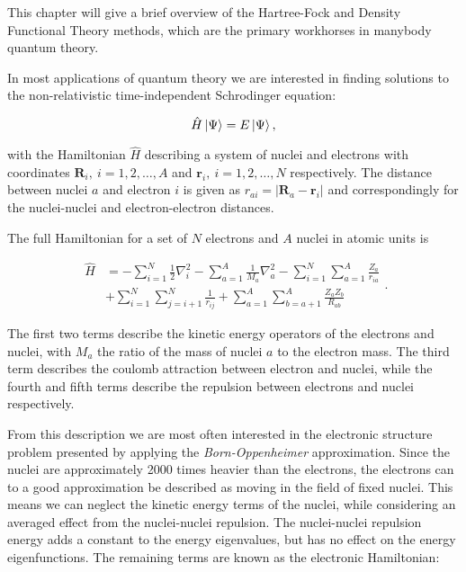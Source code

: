 This chapter will give a brief overview of the Hartree-Fock
and Density Functional Theory methods, which are the primary workhorses
in manybody quantum theory.
\par
In most applications of quantum theory we are interested in
finding solutions to the non-relativistic time-independent
Schrodinger equation:

$$ \hat{H} \ket{\Psi} = E \ket{\Psi} ,$$

with the Hamiltonian $\hat{H}$ describing a system of nuclei and electrons
with coordinates $\bm{R}_i, \ i=1,2,\dots,A$ and $\bm{r}_i, \
i=1,2,\dots,N$ respectively. The distance between nuclei $a$
and electron $i$ is given as $r_{ai} = \left| \bm{R}_a - \bm{r}_i \right|$
and correspondingly for the nuclei-nuclei and electron-electron distances.
\par
The full Hamiltonian for a set of $N$ electrons and $A$ nuclei
in atomic units is

\begin{equation}
    \begin{split}
        \hat{H}
        &= -\sum_{i=1}^N \frac{1}{2} \nabla_i^2
        -\sum_{a=1}^A \frac{1}{M_a} \nabla_a^2
        -\sum_{i=1}^N \sum_{a=1}^A \frac{Z_a}{r_{ia}} \\
        &+ \sum_{i=1}^N \sum_{j=i+1}^N \frac{1}{r_{ij}}
        + \sum_{a=1}^A \sum_{b=a+1}^A \frac{Z_a Z_b}{R_{ab}}
    \end{split} .
\end{equation}

The first two terms describe the kinetic energy operators
of the electrons and nuclei, with $M_a$ the ratio of the mass
of nuclei $a$ to the electron mass. The third term describes the
coulomb attraction between electron and nuclei, while the fourth and fifth
terms describe the repulsion between electrons and nuclei respectively.
\par
From this description we are most often interested in the electronic
structure problem presented by applying the \textit{Born-Oppenheimer}
approximation. Since the nuclei are approximately 2000 times heavier
than the electrons, the electrons can to a good approximation
be described as moving in the field of fixed nuclei. This means we
can neglect the kinetic energy terms of the nuclei, while considering
an averaged effect from the nuclei-nuclei repulsion.
The nuclei-nuclei repulsion energy adds a constant to the energy
eigenvalues, but has no effect on the energy eigenfunctions.
The remaining terms are known as the electronic Hamiltonian:

